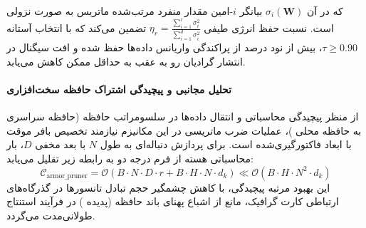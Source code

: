 که در آن $\sigma_i(\mathbf{W})$ بیانگر $i$-امین مقدار منفرد مرتب‌شده ماتریس به صورت نزولی است. نسبت حفظ انرژی طیفی $\eta_r = \frac{\sum_{i=1}^r \sigma_i^2}{\sum_{i=1}^{d} \sigma_i^2}$ تضمین می‌کند که با انتخاب آستانه $\tau \ge 0.90$، بیش از نود درصد از پراکندگی واریانس داده‌ها حفظ شده و افت سیگنال در انتشار گرادیان رو به عقب به حداقل ممکن کاهش می‌یابد.

\paragraph{تحلیل مجانبی و پیچیدگی اشتراک حافظه سخت‌افزاری}
از منظر پیچیدگی محاسباتی و انتقال داده‌ها در سلسومراتب حافظه (حافظه سراسری  به حافظه محلی )، عملیات ضرب ماتریسی در این مکانیزم نیازمند تخصیص بافر موقت با ابعاد فاکتورگیری‌شده است. برای پردازش دنباله‌ای به طول $N$ با بعد مخفی $D$، بار محاسباتی هسته از فرم درجه دو به رابطه زیر تقلیل می‌یابد:
\begin{equation}
\label{eq:complexity_armor_pruner}
\mathcal{C}_{\text{armor\_pruner}} = \mathcal{O}\left( B \cdot N \cdot D \cdot r + B \cdot H \cdot N \cdot d_k \right) \ll \mathcal{O}\left( B \cdot H \cdot N^2 \cdot d_k \right)
\end{equation}
این بهبود مرتبه پیچیدگی، با کاهش چشمگیر حجم تبادل تانسورها در گذرگاه‌های ارتباطی کارت گرافیک، مانع از اشباع پهنای باند حافظه (پدیده ) در فرآیند استنتاج طولانی‌مدت می‌گردد.
